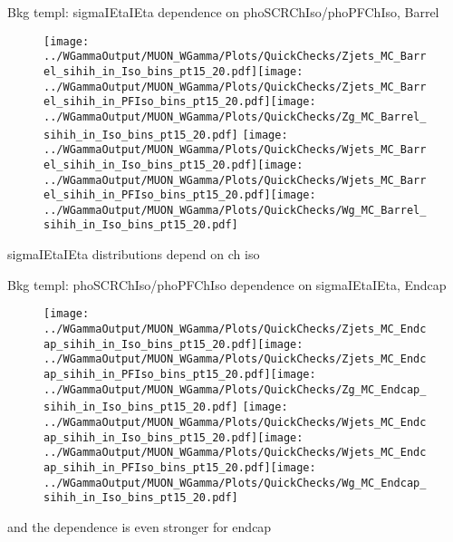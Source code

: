 \documentclass{beamer}
\begin{document}
\begin{frame}{Bkg templ: sigmaIEtaIEta dependence on phoSCRChIso/phoPFChIso, Barrel}
  \begin{figure}
    \centering
    \texttt{[image: ../WGammaOutput/MUON\_WGamma/Plots/QuickChecks/Zjets\_MC\_Barrel\_sihih\_in\_Iso\_bins\_pt15\_20.pdf]}\texttt{[image: ../WGammaOutput/MUON\_WGamma/Plots/QuickChecks/Zjets\_MC\_Barrel\_sihih\_in\_PFIso\_bins\_pt15\_20.pdf]}\texttt{[image: ../WGammaOutput/MUON\_WGamma/Plots/QuickChecks/Zg\_MC\_Barrel\_sihih\_in\_Iso\_bins\_pt15\_20.pdf]}
    \texttt{[image: ../WGammaOutput/MUON\_WGamma/Plots/QuickChecks/Wjets\_MC\_Barrel\_sihih\_in\_Iso\_bins\_pt15\_20.pdf]}\texttt{[image: ../WGammaOutput/MUON\_WGamma/Plots/QuickChecks/Wjets\_MC\_Barrel\_sihih\_in\_PFIso\_bins\_pt15\_20.pdf]}\texttt{[image: ../WGammaOutput/MUON\_WGamma/Plots/QuickChecks/Wg\_MC\_Barrel\_sihih\_in\_Iso\_bins\_pt15\_20.pdf]}
  \end{figure}
  \scriptsize sigmaIEtaIEta distributions depend on ch iso
\end{frame}

\begin{frame}{Bkg templ: phoSCRChIso/phoPFChIso dependence on sigmaIEtaIEta, Endcap}
  \begin{figure}
    \centering
    \texttt{[image: ../WGammaOutput/MUON\_WGamma/Plots/QuickChecks/Zjets\_MC\_Endcap\_sihih\_in\_Iso\_bins\_pt15\_20.pdf]}\texttt{[image: ../WGammaOutput/MUON\_WGamma/Plots/QuickChecks/Zjets\_MC\_Endcap\_sihih\_in\_PFIso\_bins\_pt15\_20.pdf]}\texttt{[image: ../WGammaOutput/MUON\_WGamma/Plots/QuickChecks/Zg\_MC\_Endcap\_sihih\_in\_Iso\_bins\_pt15\_20.pdf]}
    \texttt{[image: ../WGammaOutput/MUON\_WGamma/Plots/QuickChecks/Wjets\_MC\_Endcap\_sihih\_in\_Iso\_bins\_pt15\_20.pdf]}\texttt{[image: ../WGammaOutput/MUON\_WGamma/Plots/QuickChecks/Wjets\_MC\_Endcap\_sihih\_in\_PFIso\_bins\_pt15\_20.pdf]}\texttt{[image: ../WGammaOutput/MUON\_WGamma/Plots/QuickChecks/Wg\_MC\_Endcap\_sihih\_in\_Iso\_bins\_pt15\_20.pdf]}
  \end{figure}
  \scriptsize and the dependence is even stronger for endcap
\end{frame}
\end{document}
